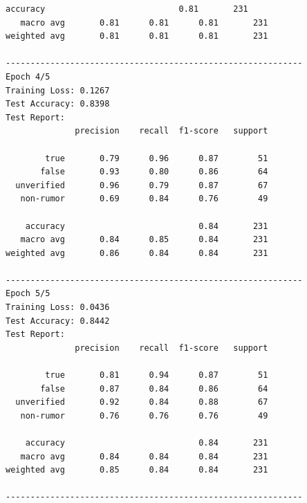 \documentclass[11pt]{article}
\begin{document}
\begin{Verbatim}[commandchars=\\\{\}]
    accuracy                           0.81       231
   macro avg       0.81      0.81      0.81       231
weighted avg       0.81      0.81      0.81       231

------------------------------------------------------------
Epoch 4/5
Training Loss: 0.1267
Test Accuracy: 0.8398
Test Report:
              precision    recall  f1-score   support

        true       0.79      0.96      0.87        51
       false       0.93      0.80      0.86        64
  unverified       0.96      0.79      0.87        67
   non-rumor       0.69      0.84      0.76        49

    accuracy                           0.84       231
   macro avg       0.84      0.85      0.84       231
weighted avg       0.86      0.84      0.84       231

------------------------------------------------------------
Epoch 5/5
Training Loss: 0.0436
Test Accuracy: 0.8442
Test Report:
              precision    recall  f1-score   support

        true       0.81      0.94      0.87        51
       false       0.87      0.84      0.86        64
  unverified       0.92      0.84      0.88        67
   non-rumor       0.76      0.76      0.76        49

    accuracy                           0.84       231
   macro avg       0.84      0.84      0.84       231
weighted avg       0.85      0.84      0.84       231

------------------------------------------------------------
    \end{Verbatim}
\end{document}
